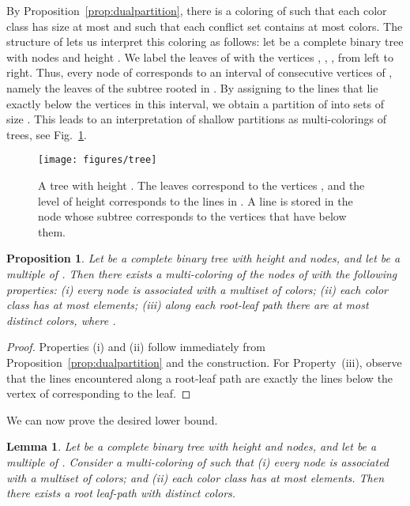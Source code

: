 \documentclass{paper}
\newtheorem {prop}[theorem] {Proposition}
\newtheorem {lemma}[theorem] {Lemma}
\begin{document}
By Proposition~\ref{prop:dualpartition}, there is a coloring of 
 such that each color class 
has size at most  and such that each conflict set contains at most
 colors. The structure of  lets us interpret this
coloring as follows:
let  be a complete binary tree with 
 nodes and height . We label the leaves of  with 
the vertices , , , from left to right. 
Thus, every node  of  corresponds to an interval of
consecutive vertices of , namely the leaves
of the subtree rooted in .
By assigning to  the lines that lie exactly below the
vertices in this interval,
we  obtain a partition of  into sets of
size . This leads to an 
interpretation of shallow partitions as multi-colorings
of trees, see Fig.~\ref{fig:tree}.
\begin{figure}[htb] 
  \begin{center}
   \texttt{[image: figures/tree]}
  \end{center}
  \caption{A tree with height . The leaves correspond to
  the vertices , and the level of height  corresponds to the lines
  in . A line  is stored in the node whose subtree corresponds to the
  vertices that have  below them.}
  \label{fig:tree}
\end{figure}



\begin{prop}\label{prop:tree}
Let  be a complete binary tree with height  and  nodes,
and let  be a multiple of .
Then there exists a multi-coloring of the nodes of  with the
following properties: 
(i) every node is associated with a multiset of  colors;
(ii) each color class has at most  elements; (iii) along each
root-leaf path there are at most  distinct colors,
where .
\end{prop}

\begin{proof}
Properties (i) and (ii) follow immediately from 
Proposition~\ref{prop:dualpartition} and the construction. 
For Property~(iii), observe that the lines encountered
along a root-leaf path are exactly the lines
below the vertex of  corresponding to the leaf.
\end{proof}

We can now prove the desired lower bound.

\begin{lemma}\label{lem:lowerb}
Let  be a complete binary tree with height  and  nodes, 
and let  be a multiple of .
Consider a multi-coloring of  such that
(i) every node is associated with a multiset of 
colors; and (ii) each color class has at most  elements.
Then there exists a root leaf-path with  
distinct colors.
\end{lemma}
\end{document}
